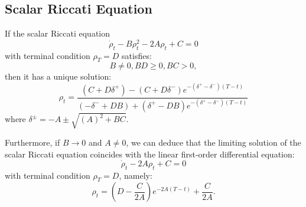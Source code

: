 \documentclass[11pt]{article}
\begin{document}
\begin{appendices}
\subsection*{\textbf{Scalar Riccati Equation}} If the scalar Riccati equation 
	\begin{equation*}
		\dot{\rho}_t - B \rho_t^2 - 2A \rho_t  + C = 0 
	\end{equation*}
	with terminal condition $\rho_T = D$ satisfies:
	\begin{equation}
		B \neq 0, BD \geq 0, BC>0,
	\label{eq:Riccati_assumptions}
	\end{equation}
	then it has a unique solution:
\begin{equation}
		\rho_t= \frac{(C+D \delta^+) - (C+D \delta^-) e^{-(\delta^+ - \delta^-)(T-t)}}{(-\delta^- + D B) + (\delta^+ - D B) e^{-(\delta^+ - \delta^-)(T-t)}}
	\label{eq:riccati_ut_sol_app}
\end{equation}
	where $\delta^\pm = -A \pm \sqrt{(A)^2 + B C}$.
	
	Furthermore, if $B \to 0$ and $A\neq 0$, we can deduce that the limiting solution of the scalar Riccati equation coincides with the linear first-order differential equation:
	\begin{equation*}
		\dot{\rho}_t - 2A \rho_t +C = 0 
	\end{equation*}
	with terminal condition $\rho_T = D$, namely:
	\begin{equation*}
		\rho_t = \left(D - \frac{C}{2A} \right) e^{-2A (T-t)} + \frac{C}{2A}.
	\end{equation*}
	

\end{appendices}
\end{document}
